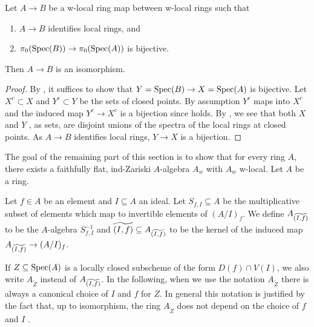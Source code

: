 \begin{lemma}[\stacksproject{097E}]
  \label{thm:isom-of-identifies-local-rings-w-local-isom-pi0}
  \leanok
  Let $A \to B$ be a w-local ring map between w-local rings such that
  \begin{enumerate}
    \item $A \to B$ identifies local rings, and
    \item $\pi_0(\operatorname{Spec} (B)) \to \pi_0(\operatorname{Spec} (A))$ is bijective.
  \end{enumerate}
  Then $A \to B$ is an isomorphism.
\end{lemma}

\begin{proof}
  \leanok
  By , it suffices to show
  that $Y = \operatorname{Spec} (B) \to X = \operatorname{Spec} (A)$ is bijective.
  Let $X^c \subset X$ and $Y^c \subset Y$ be the sets of closed points. By assumption $Y^c$ maps into $X^c$ and the induced map $Y^c \to X^c$ is a bijection since  holds. By , we see that both $X$ and $Y$ , as sets, are disjoint unions of the spectra of the local rings at closed points. As \(A \to B\) identifies local rings, $Y \to X$ is a bijection.
\end{proof}

The goal of the remaining part of this section is to show that for every ring $A$, there exists a faithfully flat, ind-Zariski
$A$-algebra $A_{w}$ with $A_w$ w-local. Let $A$ be a ring.

\begin{definition}
    Let $f \in A$ be an element and $I \subseteq A$ an ideal.
    Let $S_{f, I} \subseteq A$ be the multiplicative subset of elements which map to invertible
    elements of $(A/I)_{f}$.
    We define $A_{\widetilde{(I, f)}}$ to be the $A$-algebra $S_{f, I}^{-1}$
    and $\widetilde{(I, f)} \subseteq A_{\widetilde{(I, f)}}$ to be the kernel of
    the induced map $A_{\widetilde{(I, f)}} \to (A / I)_{f}$.
    \label{def:tilde-locclosed}
    \leanok
\end{definition}

If $Z \subseteq \mathrm{Spec}(A)$ is a locally closed subscheme of the form $D(f) \cap V(I)$, we
also write $A_{\widetilde{Z}}$ instead of $A_{\widetilde{(I, f)}}$.
In the following, when we use the notation $A_{\widetilde{Z}}$ there is always a canonical
choice of $I$ and $f$ for $Z$.
In general this notation is justified by the fact that, up to isomorphism, the ring $A_{\widetilde{Z}}$ does not depend
on the choice of $f$ and $I$ .

